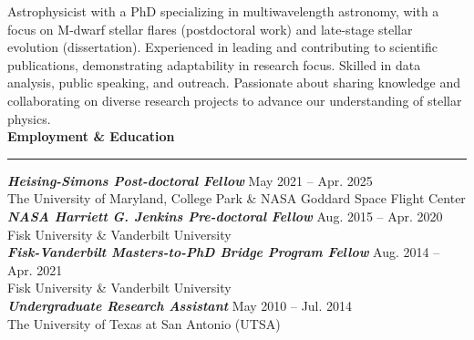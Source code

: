 \documentclass[letter,12pt]{article}
\begin{document}
\noindent Astrophysicist with a PhD specializing in multiwavelength astronomy, with a focus on M-dwarf stellar flares (postdoctoral work) and late-stage stellar evolution (dissertation). Experienced in leading and contributing to scientific publications, demonstrating adaptability in research focus. Skilled in data analysis, public speaking, and outreach. Passionate about sharing knowledge and collaborating on diverse research projects to advance our understanding of stellar physics. \\


\noindent
{\bf Employment \& Education} \\
\vspace{-10mm}
\begin{center}
\rule{\textwidth}{0.2mm}
\end{center}
\vspace{-3mm}
\textbf{\textit{Heising-Simons Post-doctoral Fellow}}  \hfill  May 2021 -- Apr. 2025 \\
\hspace*{1cm}The University of Maryland, College Park \& NASA Goddard Space Flight Center\\
\textbf{\textit{NASA Harriett G. Jenkins Pre-doctoral Fellow}} \hfill  Aug. 2015 -- Apr. 2020\\
\hspace*{1cm}Fisk University \& Vanderbilt University \\
\noindent\textit{\textbf{Fisk-Vanderbilt Masters-to-PhD Bridge Program Fellow}} \hfill  Aug. 2014 -- Apr. 2021 \\
\hspace*{1cm}Fisk University \& Vanderbilt University \\
\textbf{\textit{Undergraduate Research Assistant}} \hfill  May 2010 -- Jul. 2014 \\
\hspace*{1cm}The University of Texas at San Antonio (UTSA) \\
\end{document}
